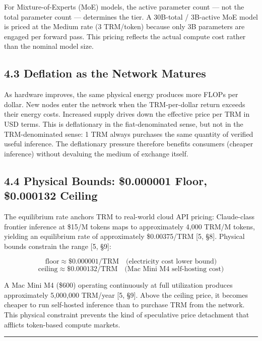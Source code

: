 \documentclass[
  11pt,
]{article}
\begin{document}
For Mixture-of-Experts (MoE) models, the active parameter count --- not
the total parameter count --- determines the tier. A 30B-total /
3B-active MoE model is priced at the Medium rate (3 TRM/token) because
only 3B parameters are engaged per forward pass. This pricing reflects
the actual compute cost rather than the nominal model size.

\subsection{4.3 Deflation as the Network
Matures}\label{deflation-as-the-network-matures}

As hardware improves, the same physical energy produces more FLOPs per
dollar. New nodes enter the network when the TRM-per-dollar return
exceeds their energy costs. Increased supply drives down the effective
price per TRM in USD terms. This is deflationary in the fiat-denominated
sense, but not in the TRM-denominated sense: 1 TRM always purchases the
same quantity of verified useful inference. The deflationary pressure
therefore benefits consumers (cheaper inference) without devaluing the
medium of exchange itself.

\subsection{4.4 Physical Bounds: \$0.000001 Floor, \$0.000132
Ceiling}\label{physical-bounds-0.000001-floor-0.000132-ceiling}

The equilibrium rate anchors TRM to real-world cloud API pricing:
Claude-class frontier inference at \$15/M tokens maps to approximately
4,000 TRM/M tokens, yielding an equilibrium rate of approximately
\$0.00375/TRM {[}5, §8{]}. Physical bounds constrain the range {[}5,
§9{]}:

\[\text{floor} \approx \$0.000001/\text{TRM} \quad \text{(electricity cost lower bound)}\]
\[\text{ceiling} \approx \$0.000132/\text{TRM} \quad \text{(Mac Mini M4 self-hosting cost)}\]

A Mac Mini M4 (\$600) operating continuously at full utilization
produces approximately 5,000,000 TRM/year {[}5, §9{]}. Above the ceiling
price, it becomes cheaper to run self-hosted inference than to purchase
TRM from the network. This physical constraint prevents the kind of
speculative price detachment that afflicts token-based compute markets.

\begin{center}\rule{0.5\linewidth}{0.5pt}\end{center}
\end{document}
